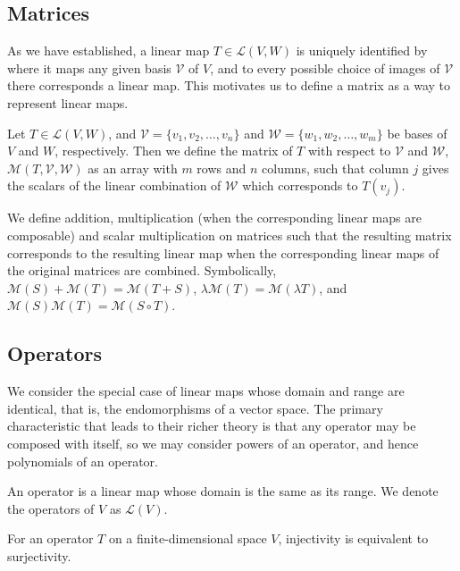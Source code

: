 \documentclass[]{article}
\begin{document}
\subsection{Matrices}

As we have established, a linear map $T \in \mathcal{L}(V,W)$ is uniquely identified by where it maps any given basis $\mathcal{V}$ of $V$, and to every possible choice of images of $\mathcal{V}$ there corresponds a linear map. This motivates us to define a matrix as a way to represent linear maps.

\begin{defi} [Matrix]
		Let $T \in \mathcal{L}(V,W)$, and $\mathcal{V} = \{v_1, v_2, \ldots, v_n\}$ and $\mathcal{W} = \{w_1, w_2, \ldots, w_m\}$ be bases of $V$ and $W$, respectively. Then we define the matrix of $T$ with respect to $\mathcal{V}$ and $\mathcal{W}$, $\mathcal{M}(T,  \mathcal{V}, \mathcal{W})$ as an array with $m$ rows and $n$ columns, such that column $j$ gives the scalars of the linear combination of $\mathcal{W}$ which corresponds to $T(v_j)$.

		We define addition, multiplication (when the corresponding linear maps are composable) and scalar multiplication  on matrices such that the resulting matrix corresponds to the resulting linear map when the corresponding linear maps of the original matrices are combined. Symbolically, $\mathcal{M}(S) + \mathcal{M}(T) = \mathcal{M}(T+S)$, $\lambda \mathcal{M}(T) = \mathcal{M}(\lambda T)$, and $\mathcal{M}(S) \mathcal{M}(T) = \mathcal{M}(S \circ T)$.
\end{defi}

\subsection{Operators}

We consider the special case of linear maps whose domain and range are identical, that is, the endomorphisms of a vector space. The primary characteristic that leads to their richer theory is that any operator may be composed with itself, so we may consider powers of an operator, and hence polynomials of an operator.

\begin{defi} [Operator]
		An operator is a linear map whose domain is the same as its range. We denote the operators of $V$ as $\mathcal{L}(V)$.
\end{defi}

\begin{thm}
		For an operator $T$ on a finite-dimensional space $V$, injectivity is equivalent to surjectivity.
\end{thm}
\end{document}
